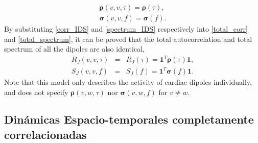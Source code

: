  \begin{eqnarray}
 \boldsymbol{\rho}(v,v,\tau)=\boldsymbol{\rho}(\tau), \label{corr_IDS}\\
 \boldsymbol{\sigma}(v,v,f)=\boldsymbol{\sigma}(f). \label{spectrum_IDS}
 \end{eqnarray}
 By substituting \eqref{corr_IDS} and \eqref{spectrum_IDS} respectively into \eqref{total_corr} and \eqref{total_spectrum}, it can be proved that the total autocorrelation and total spectrum of all the dipoles are also identical,
 \begin{eqnarray}
 R_{J}(v,v,\tau)&=&R_{J}(\tau)=\mathbf{1}^{T} \boldsymbol{\rho}(\tau)  \mathbf{1},\label{total_corr_IDS}\\
 S_{J}(v,v,f)&=&S_{J}(f)=\mathbf{1}^{T} \boldsymbol{\sigma}(f)  \mathbf{1}. \label{total_spectrum_IDS}
 \end{eqnarray}
 Note that this model only describes the activity of cardiac dipoles individually, and does not specify $\boldsymbol{\rho}(v,w,\tau)$ nor $\boldsymbol{\sigma}(v,w,f)$ for $v\neq w$.

\subsection{Dinámicas Espacio-temporales completamente correlacionadas }

%

